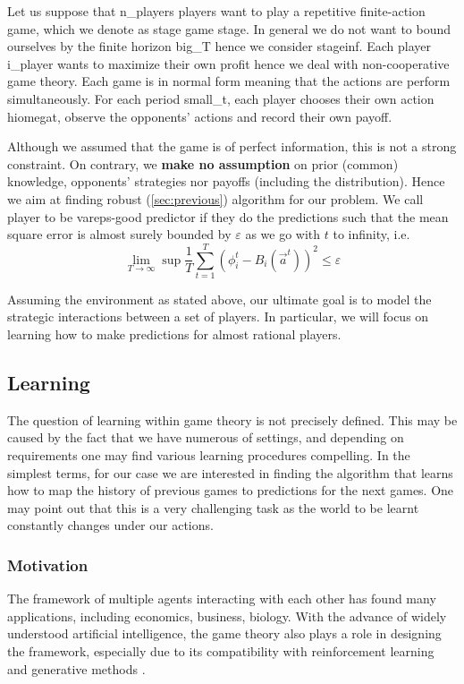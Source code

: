 \documentclass[]{spie}  %
\begin{document}
Let us suppose that \gls{n_players} players want to play a repetitive finite-action game, which we denote as stage game \gls{stage}. In general we do not want to bound ourselves by the finite horizon \gls{big_T} hence we consider \gls{stageinf}. Each player \gls{i_player} wants to maximize their own profit hence we deal with non-cooperative game theory. Each game is in normal form meaning that the actions are perform simultaneously. For each period \gls{small_t}, each player chooses their own action \gls{hiomegat}, observe the opponents' actions and record their own payoff.

Although we assumed that the game is of perfect information, this is not a strong constraint. On contrary, we \textbf{make no assumption} on prior (common) knowledge, opponents' strategies nor payoffs (including the distribution). Hence we aim at finding robust (\autoref{sec:previous}) algorithm for our problem. We call player to be \gls{vareps}-good predictor if they do the predictions such that the mean square error is almost surely bounded by $\varepsilon$ as we go with $t$ to infinity, i.e.
$$ \lim_{T \to \infty} \sup \frac{1}{T} \sum_{t=1}^T (\phi_i^t - B_i(\overrightarrow{a}^t))^2 \leq \varepsilon$$

Assuming the environment as stated above, our ultimate goal is to model the strategic interactions between a set of players. In particular, we will focus on learning how to make predictions for almost rational players.

\subsection{Learning}
\label{sec:learning}
The question of learning within game theory is not precisely defined. This may be caused by the fact that we have numerous of settings, and depending on requirements one may find various learning procedures compelling. In the simplest terms, for our case we are interested in finding the algorithm that learns how to map the history of previous games to predictions for the next games. One may point out that this is a very challenging task as the world to be learnt constantly changes under our actions.

\subsubsection{Motivation}
\label{sec:motivation}
The framework of multiple agents interacting with each other has found many applications, including economics, business, biology. With the advance of widely understood artificial intelligence, the game theory also plays a role in designing the framework, especially due to its compatibility with reinforcement learning \cite{nowe2012game} and generative methods \cite{goodfellow2014generative} \cite{zhou2019survey}.
\end{document}
